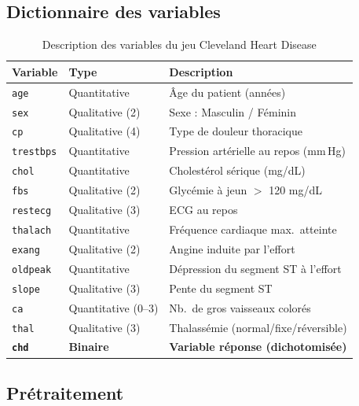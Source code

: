 \documentclass[11pt,a4paper,twoside]{report}
\theoremstyle{definition}
\begin{document}
\subsection{Dictionnaire des variables}

\begin{table}[H]
\centering
\caption{Description des variables du jeu Cleveland Heart Disease}
\label{tab:variables}
\small
\begin{tabular}{lll}
\toprule
\textbf{Variable} & \textbf{Type} & \textbf{Description} \\
\midrule
\texttt{age}      & Quantitative       & Âge du patient (années) \\
\texttt{sex}      & Qualitative (2)    & Sexe : Masculin / Féminin \\
\texttt{cp}       & Qualitative (4)    & Type de douleur thoracique \\
\texttt{trestbps} & Quantitative       & Pression artérielle au repos (mm\,Hg) \\
\texttt{chol}     & Quantitative       & Cholestérol sérique (mg/dL) \\
\texttt{fbs}      & Qualitative (2)    & Glycémie à jeun $>$ 120 mg/dL \\
\texttt{restecg}  & Qualitative (3)    & ECG au repos \\
\texttt{thalach}  & Quantitative       & Fréquence cardiaque max.\ atteinte \\
\texttt{exang}    & Qualitative (2)    & Angine induite par l'effort \\
\texttt{oldpeak}  & Quantitative       & Dépression du segment ST à l'effort \\
\texttt{slope}    & Qualitative (3)    & Pente du segment ST \\
\texttt{ca}       & Quantitative (0--3) & Nb.\ de gros vaisseaux colorés \\
\texttt{thal}     & Qualitative (3)    & Thalassémie (normal/fixe/réversible) \\
\midrule
\textbf{\texttt{chd}} & \textbf{Binaire} & \textbf{Variable réponse (dichotomisée)} \\
\bottomrule
\end{tabular}
\end{table}

\subsection{Prétraitement}
\end{document}

